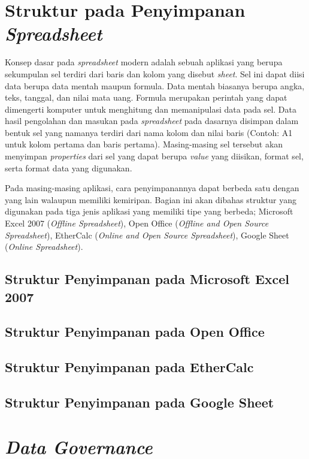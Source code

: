 \section{Struktur pada Penyimpanan \textit{Spreadsheet}}
Konsep dasar pada \textit{spreadsheet} modern adalah sebuah aplikasi yang berupa sekumpulan sel terdiri dari baris dan kolom yang disebut \textit{sheet}. Sel ini dapat diisi data berupa data mentah maupun formula. Data mentah biasanya berupa angka, teks, tanggal, dan nilai mata uang. Formula merupakan perintah yang dapat dimengerti komputer untuk menghitung dan memanipulasi data pada sel. Data hasil pengolahan dan masukan pada \textit{spreadsheet} pada dasarnya disimpan dalam bentuk sel yang namanya terdiri dari nama kolom dan nilai baris (Contoh: A1 untuk kolom pertama dan baris pertama). Masing-masing sel tersebut akan menyimpan \textit{properties} dari sel yang dapat berupa \textit{value} yang diisikan, format sel, serta format data yang digunakan. 

Pada masing-masing aplikasi, cara penyimpanannya dapat berbeda satu dengan yang lain walaupun memiliki kemiripan. Bagian ini akan dibahas struktur yang digunakan pada tiga jenis aplikasi yang memiliki tipe yang berbeda; Microsoft Excel 2007 (\textit{Offline Spreadsheet}), Open Office (\textit{Offline and Open Source Spreadsheet}), EtherCalc (\textit{Online and Open Source Spreadsheet}), Google Sheet (\textit{Online Spreadsheet}).

    \subsection{Struktur Penyimpanan pada Microsoft Excel 2007}

    \subsection{Struktur Penyimpanan pada Open Office}

    \subsection{Struktur Penyimpanan pada EtherCalc}

    \subsection{Struktur Penyimpanan pada Google Sheet}

\section{\textit{Data Governance}}


